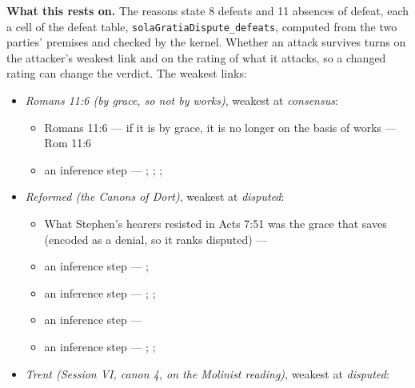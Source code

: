 \documentclass[11pt]{article}
\begin{document}
\par\noindent\textbf{What this rests on.} The reasons state 8 defeats and 11 absences of defeat, each a cell of the defeat table, \texttt{sola\allowbreak{}Gratia\allowbreak{}Dispute\_\allowbreak{}defeats}, computed from the two parties' premises and checked by the kernel. Whether an attack survives turns on the attacker's weakest link and on the rating of what it attacks, so a changed rating can change the verdict. The weakest links:
\begin{itemize}
\item \emph{Romans 11:6 (by grace, so not by works)}, weakest at \emph{consensus}:
\begin{itemize}
\item Romans 11:6 — if it is by grace, it is no longer on the basis of works --- Rom 11:6
\item an inference step --- \cite[Trent, Session VI (1547), ch. 8]{tanner-decrees-1990}; \cite[36]{waterworth-trent-1848}; \cite[Five Arminian Articles (1610), art. 4]{schaff-creeds-christendom-3-1977}; \cite[Canons of Dort, III/IV, art. 10]{schaff-creeds-christendom-3-1977}
\end{itemize}
\item \emph{Reformed (the Canons of Dort)}, weakest at \emph{disputed}:
\begin{itemize}
\item What Stephen’s hearers resisted in Acts 7:51 was the grace that saves (encoded as a denial, so it ranks disputed) --- \cite[Canons of Dort, III/IV, art. 9]{schaff-creeds-christendom-3-1977}
\item an inference step --- \cite[ad loc. Eph 2:8]{robertson-word-pictures-4-1931}; \cite[228--229]{calvin-galatians-ephesians-1854}
\item an inference step --- \cite[600]{arminius-works-1-1825}; \cite[681]{arminius-works-1-1825}; \cite[Five Arminian Articles (1610), art. 4]{schaff-creeds-christendom-3-1977}
\item an inference step --- \cite[527--565]{arminius-works-3-1853}
\item an inference step --- \cite[Solid Declaration II.89]{concordia-triglotta-1921}; \cite[Solid Declaration II.60]{concordia-triglotta-1921}; \cite[Solid Declaration XI.41]{concordia-triglotta-1921}
\end{itemize}
\item \emph{Trent (Session VI, canon 4, on the Molinist reading)}, weakest at \emph{disputed}:
\begin{itemize}

\end{itemize}
\end{itemize}
\end{document}

